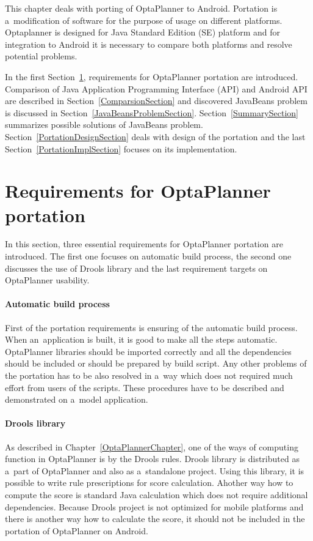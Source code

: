 This chapter deals with porting of OptaPlanner to Android. Portation is a~modification of software for the purpose of
usage on different platforms. Optaplanner is designed for Java Standard Edition (SE) platform and for integration to
Android it is necessary to compare both platforms and resolve potential problems.

In the first Section~\ref{RequirementsPortationSection}, requirements for OptaPlanner portation are introduced.
Comparison of Java Application Programming Interface (API) and Android API are described in
Section~\ref{ComparsionSection} and discovered JavaBeans problem is discussed in Section~\ref{JavaBeansProblemSection}.
Section~\ref{SummarySection} summarizes possible solutions of JavaBeans problem. Section~\ref{PortationDesignSection}
deals with design of the portation and the last Section~\ref{PortationImplSection} focuses on its implementation.

\section{Requirements for OptaPlanner portation}\label{RequirementsPortationSection}
In this section, three essential requirements for OptaPlanner portation are introduced. The first one focuses on
automatic build process, the second one discusses the use of Drools library and the last requirement targets on
OptaPlanner usability.

\paragraph{Automatic build process}
First of the portation requirements is ensuring of the automatic build process. When an~application is built, it is
good to make all the steps automatic. OptaPlanner libraries should be imported correctly and all the dependencies should
be included or should be prepared by build script. Any other problems of the portation has to be also resolved in a~way
which does not required much effort from users of the scripts. These procedures have to be described and demonstrated on
a~model application.

\paragraph{Drools library}
As described in Chapter~\ref{OptaPlannerChapter}, one of the ways of computing function in OptaPlanner is by the Drools
rules. Drools library is distributed as a~part of OptaPlanner and also as a~standalone project. Using this library, it
is possible to write rule prescriptions for score calculation. Ahother way how to compute the score is standard Java
calculation which does not require additional dependencies. Because Drools project is not optimized for mobile platforms
and there is another way how to calculate the score, it should not be included in the portation of OptaPlanner on
Android.

